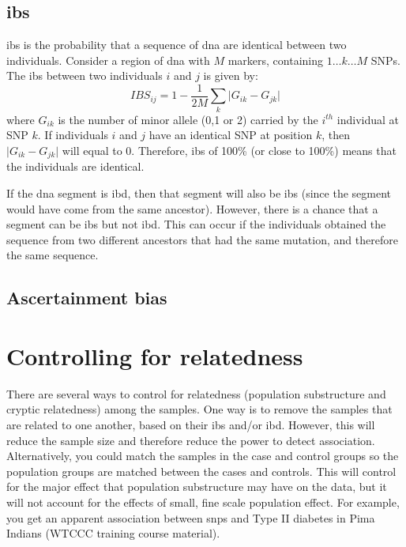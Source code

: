 \subsection{\Acrfull{ibs}}
\label{sub:ibs}

\Gls{ibs} is the probability that a sequence of \acrshort{dna}  are identical between two individuals.
Consider a region of \acrshort{dna} with $M$ markers, containing $1\dots k\dots M$ SNPs.
The \gls{ibs} between two individuals $i$ and $j$ is given by:
\begin{equation*}
	IBS_{ij} = 1 - \frac{1}{2M}\sum_k \lvert G_{ik} - G_{jk} \rvert
\end{equation*}
where $G_{ik}$ is the number of minor allele (0,1 or 2) carried by the $i^{th}$ individual at SNP $k$.
If individuals $i$ and $j$ have an identical SNP at position $k$, then $\lvert G_{ik} - G_{jk} \rvert$ will equal to 0.
Therefore, \gls{ibs} of 100\% (or close to 100\%) means that the individuals are identical.

If the \acrshort{dna} segment is \gls{ibd}, then that segment will also be \gls{ibs} (since the segment would have come from the same ancestor).
However, there is  a chance that a segment can be \gls{ibs} but not \gls{ibd}.
This can occur if the individuals obtained the sequence from two different ancestors that had the same mutation, and therefore the same sequence.

\subsection{Ascertainment bias}
\label{sub:ascertainment_bias}


















\section{Controlling for relatedness}
\label{sec:controlling_for_relatedness}

There are several ways to control for relatedness (population substructure and cryptic relatedness) among the samples.
One way is to remove the samples that are related to one another, based on their \gls{ibs} and/or \gls{ibd}.
However, this will reduce the sample size and therefore reduce the power to detect association.
Alternatively, you could match the samples in the case and control groups so the population groups are matched between the cases and controls.
This will control for the major effect that population substructure may have on the data, but it will not account for the effects of small, fine scale population effect.
For example, you get an apparent association between \glspl{snp} and Type II diabetes in Pima Indians (WTCCC training course material).

